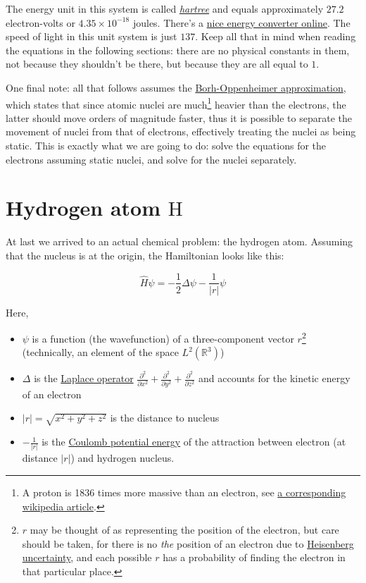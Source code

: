 \documentclass{article}
\newcommand{\molecule}[1]{\textrm{#1}}
\begin{document}
The energy unit in this system is called \href{https://en.wikipedia.org/wiki/Hartree}{\textit{hartree}} and equals approximately \(27.2\) electron-volts or \(4.35\times 10^{-18}\) joules. There's a \href{http://www.colby.edu/chemistry/PChem/Hartree.html}{nice energy converter online}. The speed of light in this unit system is just \(137\). Keep all that in mind when reading the equations in the following sections: there are no physical constants in them, not because they shouldn't be there, but because they are all equal to \(1\).

One final note: all that follows assumes the \href{https://en.wikipedia.org/wiki/Born\%E2\%80\%93Oppenheimer_approximation}{Borh-Oppenheimer approximation}, which states that since atomic nuclei are much\footnote{A proton is 1836 times more massive than an electron, see \href{https://en.wikipedia.org/wiki/Proton-to-electron_mass_ratio}{a corresponding wikipedia article}.} heavier than the electrons, the latter should move orders of magnitude faster, thus it is possible to separate the movement of nuclei from that of electrons, effectively treating the nuclei as being static. This is exactly what we are going to do: solve the equations for the electrons assuming static nuclei, and solve for the nuclei separately.

\newpage

\section{Hydrogen atom \(\molecule{H}\)}

At last we arrived to an actual chemical problem: the hydrogen atom. Assuming that the nucleus is at the origin, the Hamiltonian looks like this:

\begin{equation}
\hat H\psi = -\frac{1}{2} \Delta \psi - \frac{1}{|r|}\psi
\end{equation}

Here, 

\begin{itemize}
\item \(\psi\) is a function (the wavefunction) of a three-component vector \(r\)\footnote{\(r\) may be thought of as representing the position of the electron, but care should be taken, for there is no \textit{the} position of an electron due to \href{https://en.wikipedia.org/wiki/Uncertainty_principle}{Heisenberg uncertainty}, and each possible \(r\) has a probability of finding the electron in that particular place.} (technically, an element of the space \(L^2(\mathbb R^3)\))
\item \(\Delta\) is the \href{https://en.wikipedia.org/wiki/Laplace_operator}{Laplace operator} \(\frac{\partial^2}{\partial x^2}+\frac{\partial^2}{\partial y^2}+\frac{\partial^2}{\partial z^2}\) and accounts for the kinetic energy of an electron
\item \(|r|=\sqrt{x^2+y^2+z^2}\) is the distance to nucleus
\item \(-\frac{1}{|r|}\) is the \href{https://en.wikipedia.org/wiki/Electric_potential_energy}{Coulomb potential energy} of the attraction between electron (at distance \(|r|\)) and hydrogen nucleus.
\end{itemize}
\end{document}
